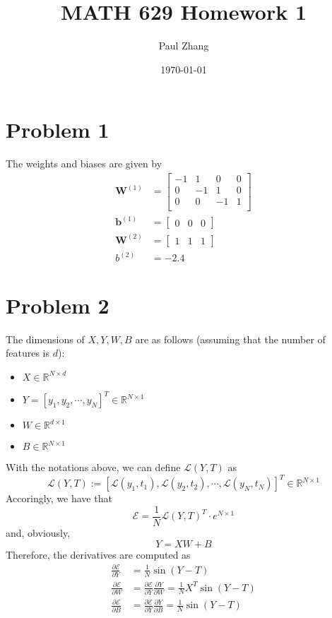 \documentclass{article}
\title{\Large\bf MATH 629 Homework 1}
\author{\normalsize Paul Zhang}
\date{\normalsize\today}
\begin{document}
\maketitle
\small
\section*{Problem 1}
The weights and biases are given by 
\begin{align*}
    \mathbf{W}^{(1)} & = \begin{bmatrix}
        -1 & 1 & 0 & 0 \\
        0 & -1 & 1 & 0 \\
        0 & 0 & -1 & 1 \\
    \end{bmatrix} \\
    \mathbf{b}^{(1)} & = \begin{bmatrix} 0 & 0 & 0\end{bmatrix} \\
    \mathbf{W}^{(2)} & = \begin{bmatrix} 1 & 1 & 1 \end{bmatrix} \\
    b^{(2)} & = -2.4
\end{align*}

\section*{Problem 2}
The dimensions of $X, Y, W, B$ are as follows (assuming that the number of features is $d$):
\begin{itemize}
    \item $X \in \mathbb{R}^{N \times d}$ 
    \item $Y = [y_1, y_2, \cdots, y_N]^T \in \mathbb{R}^{N\times 1}$
    \item $W \in \mathbb{R}^{d\times 1}$
    \item $B \in \mathbb{R}^{N\times 1}$
\end{itemize}
With the notations above, we can define $\mathcal{L}(Y ,T)$ as
$$ \mathcal{L}(Y, T) := [\mathcal{L}(y_1, t_1), \mathcal{L}(y_2, t_2), \cdots, \mathcal{L}(y_N, t_N)]^T 
\in \mathbb{R}^{N\times 1}$$
Accoringly, we have that
$$ \mathcal{E} = \frac{1}{N} \mathcal{L}(Y, T)^T \cdot e^{N\times 1} $$
and, obviously, 
$$ Y = XW + B $$
Therefore, the derivatives are computed as 
\begin{align*}
    \frac{\partial \mathcal{E}}{\partial Y} & = \frac{1}{N} \sin(Y - T) \\
    \frac{\partial \mathcal{E}}{\partial W} & = \frac{\partial \mathcal{E}}{\partial Y} \frac{\partial Y}
    {\partial W} = \frac{1}{N} X^T \sin(Y - T) \\
    \frac{\partial \mathcal{E}}{\partial B} & = \frac{\partial \mathcal{E}}{\partial Y} \frac{\partial Y}
    {\partial B} = \frac{1}{N} \sin(Y - T)
\end{align*}
\end{document}
